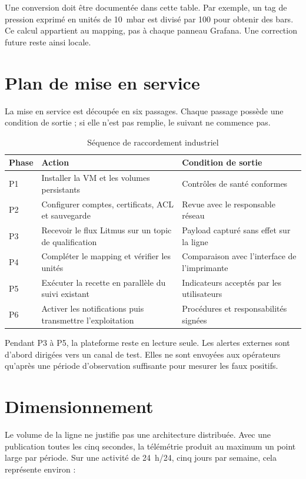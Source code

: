 Une conversion doit être documentée dans cette table. Par exemple, un tag de
pression exprimé en unités de 10~mbar est divisé par 100 pour obtenir des bars.
Ce calcul appartient au mapping, pas à chaque panneau Grafana. Une correction
future reste ainsi locale.

\section{Plan de mise en service}

La mise en service est découpée en six passages. Chaque passage possède une
condition de sortie ; si elle n'est pas remplie, le suivant ne commence pas.

\begin{table}[H]
\centering
\caption{Séquence de raccordement industriel}
\begin{tabularx}{\textwidth}{p{}p{}Y}
\toprule
Phase & Action & Condition de sortie \\
\midrule
P1 & Installer la VM et les volumes persistants & Contrôles de santé conformes \\
P2 & Configurer comptes, certificats, ACL et sauvegarde & Revue avec le responsable réseau \\
P3 & Recevoir le flux Litmus sur un topic de qualification & Payload capturé sans effet sur la ligne \\
P4 & Compléter le mapping et vérifier les unités & Comparaison avec l'interface de l'imprimante \\
P5 & Exécuter la recette en parallèle du suivi existant & Indicateurs acceptés par les utilisateurs \\
P6 & Activer les notifications puis transmettre l'exploitation & Procédures et responsabilités signées \\
\bottomrule
\end{tabularx}
\end{table}

Pendant P3 à P5, la plateforme reste en lecture seule. Les alertes externes
sont d'abord dirigées vers un canal de test. Elles ne sont envoyées aux
opérateurs qu'après une période d'observation suffisante pour mesurer les faux
positifs.

\section{Dimensionnement}

Le volume de la ligne ne justifie pas une architecture distribuée. Avec une
publication toutes les cinq secondes, la télémétrie produit au maximum un point
large par période. Sur une activité de 24~h/24, cinq jours par semaine, cela
représente environ :

